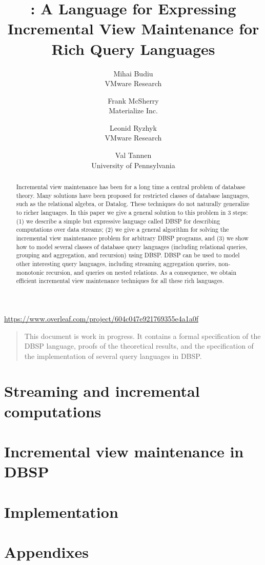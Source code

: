 \documentclass[10pt]{article}
\title{\dbsp: A Language for Expressing Incremental View Maintenance for Rich Query Languages}
\author{
Mihai Budiu \\ VMware Research \and 
Frank McSherry \\ Materialize Inc. \and 
Leonid Ryzhyk \\ VMware Research \and 
Val Tannen \\ University of Pennsylvania
}
\theoremstyle{definition}
\newcommand{\dbsp}{DBSP\xspace}
\begin{document}
\maketitle

\url{https://www.overleaf.com/project/604c047e921769355e4a1a0f}

\begin{abstract}
Incremental view maintenance has been for a long time a central problem of database theory.
Many solutions have been proposed for restricted classes of database languages,
such as the relational algebra, or Datalog.  These techniques do not naturally generalize to
richer languages.  In this paper we give a general
solution to this problem in 3 steps: (1) we describe a simple but expressive language
called \dbsp for describing computations over data streams; (2) we give a general algorithm for 
solving the incremental view maintenance problem for arbitrary \dbsp programs, and (3) we show
how to model several classes of database query languages (including relational queries, 
grouping and aggregation, and recursion) using \dbsp.  \dbsp  
can be used to model other interesting query languages, including 
streaming aggregation queries, non-monotonic recursion, and queries on nested relations.  
As a consequence, we obtain efficient
incremental view maintenance techniques for all these rich languages.
\end{abstract}

\begin{quote}
This document is work in progress.  It contains a formal specification
of the \dbsp language, proofs of the theoretical results, and the
specification of the implementation of several query languages in
\dbsp.
\end{quote}

\tableofcontents




\part{Streaming and incremental computations}


\part{Incremental view maintenance in \dbsp}





\part{Implementation}




\part{Appendixes}
\appendix


\printindex



\end{document}
